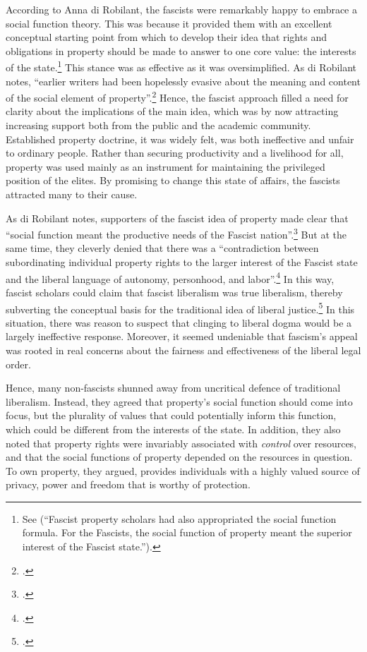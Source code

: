 According to Anna di Robilant, the fascists were remarkably happy to embrace a social function theory. This was because it provided them with an excellent conceptual starting point from which to develop their idea that rights and obligations in property should be made to answer to one core value: the interests of the state.\footnote{See \cite[908-909]{robilant13} (``Fascist property scholars had also appropriated the social function formula. For the Fascists, the social function of property meant the superior interest of the Fascist state.'').} This stance was as effective as it was oversimplified. As di Robilant notes, ``earlier writers had been hopelessly evasive about the meaning and content of the social element of property''.\footcite[909]{robilant13} Hence, the fascist approach filled a need for clarity about the implications of the main idea, which was by now attracting increasing support both from the public and the academic community. Established property doctrine, it was widely felt, was both ineffective and unfair to ordinary people. Rather than securing productivity and a livelihood for all, property was used mainly as an instrument for maintaining the privileged position of the elites. By promising to change this state of affairs, the fascists attracted many to their cause.

As di Robilant notes, supporters of the fascist idea of property made clear that ``social function meant the productive needs of the Fascist nation''.\footcite[909]{robilant13} But at the same time, they cleverly denied that there was a ``contradiction between subordinating individual property rights to the larger interest of the Fascist state and the liberal language of autonomy, personhood, and labor''.\footcite[900]{robilant13} In this way, fascist scholars could claim that fascist liberalism was true liberalism, thereby subverting the conceptual basis for the traditional idea of liberal justice.\footcite[900]{robilant13} In this situation, there was reason to suspect that clinging to liberal dogma would be a largely ineffective response. Moreover, it seemed undeniable that fascism's appeal was rooted in real concerns about the fairness and effectiveness of the liberal legal order. 

Hence, many non-fascists shunned away from uncritical defence of traditional liberalism. Instead, they agreed that property's social function should come into focus, but  the plurality of values that could potentially inform this function, which could be different from the interests of the state. In addition, they also noted that property rights were invariably associated with {\it control} over resources, and that the social functions of property depended on the resources in question. To own property, they argued, provides individuals with a highly valued source of privacy, power and freedom that is worthy of protection. 

